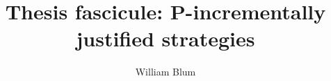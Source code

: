 

\author{William Blum}
\title{Thesis fascicule: P-incrementally justified strategies}


    \maketitle
    \tableofcontents

    

    
    

 